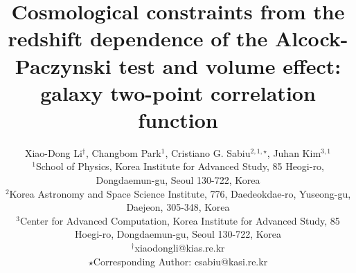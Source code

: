 \documentclass[useAMS,usenatbib]{mn2e}
\begin{document}
\title[Constraints using the Alcock-Paczynski effect]{Cosmological constraints from the redshift dependence of the Alcock-Paczynski test and volume effect: galaxy two-point correlation function}



\author[Xiao-Dong~Li, Changbom~Park, Cristiano G. Sabiu and Juhan Kim]
{ Xiao-Dong Li$^{\dagger}$, Changbom Park$^{1}$, Cristiano G. Sabiu$^{2,1,\star}$, Juhan Kim$^{3,1}$\\
$^1$School of Physics, Korea Institute for Advanced Study, 85 Heogi-ro, Dongdaemun-gu, Seoul 130-722, Korea\\
$^2$Korea Astronomy and Space Science Institute, 776, Daedeokdae-ro, Yuseong-gu, Daejeon, 305-348, Korea\\
$^3$Center for Advanced Computation, Korea Institute for Advanced Study, 85 Hoegi-ro, Dongdaemun-gu, Seoul 130-722, Korea\\
$^{\dagger}$xiaodongli@kias.re.kr\\
$\star$Corresponding Author: csabiu@kasi.re.kr}






\pagerange{\pageref{firstpage}--\pageref{lastpage}} 

\maketitle

\label{firstpage}
\end{document}
